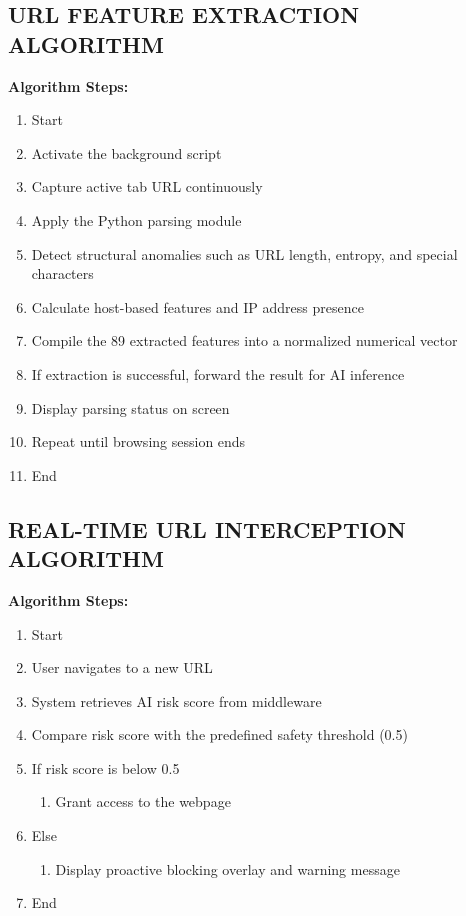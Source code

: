 \subsection{URL FEATURE EXTRACTION ALGORITHM}
\textbf{Algorithm Steps:}
\begin{enumerate}
    \item Start
    \item Activate the background script
    \item Capture active tab URL continuously
    \item Apply the Python parsing module
    \item Detect structural anomalies such as URL length, entropy, and special characters
    \item Calculate host-based features and IP address presence
    \item Compile the 89 extracted features into a normalized numerical vector
    \item If extraction is successful, forward the result for AI inference
    \item Display parsing status on screen
    \item Repeat until browsing session ends
    \item End
\end{enumerate}

\subsection{REAL-TIME URL INTERCEPTION ALGORITHM}
\textbf{Algorithm Steps:}
\begin{enumerate}
    \item Start
    \item User navigates to a new URL
    \item System retrieves AI risk score from middleware
    \item Compare risk score with the predefined safety threshold (0.5)
    \item If risk score is below 0.5
    \begin{enumerate}[label=\theenumi.\arabic*]
        \item Grant access to the webpage
    \end{enumerate}
    \item Else
    \begin{enumerate}[label=\theenumi.\arabic*]
        \item Display proactive blocking overlay and warning message
    \end{enumerate}
    \item End
\end{enumerate}

